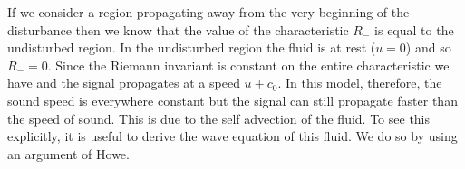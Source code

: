 If we consider a region propagating away from the very beginning of the disturbance then
we know that the value of the characteristic $R_-$ is equal to the undisturbed region.
In the undisturbed region the fluid is at rest ($u=0$) and so $R_- = 0$.
Since the Riemann invariant is constant on the entire characteristic we have
and the signal propagates at a speed $u + c_0$.
%
In this model, therefore, the sound speed is everywhere constant
but the signal can still propagate faster than the speed of sound.
This is due to the self advection of the fluid.
To see this explicitly, it is useful to derive the wave equation of this fluid.
We do so by using an argument of Howe\cite{Howe1998}.
%

